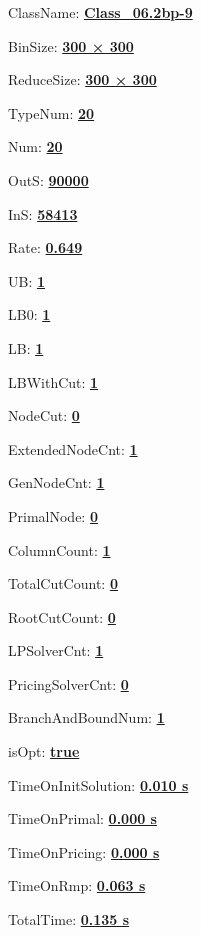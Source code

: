 \documentclass[11pt]{article}
\begin{document}
\pagestyle{empty}


ClassName: \underline{\textbf{Class_06.2bp-9}}
\par
BinSize: \underline{\textbf{300 × 300}}
\par
ReduceSize: \underline{\textbf{300 × 300}}
\par
TypeNum: \underline{\textbf{20}}
\par
Num: \underline{\textbf{20}}
\par
OutS: \underline{\textbf{90000}}
\par
InS: \underline{\textbf{58413}}
\par
Rate: \underline{\textbf{0.649}}
\par
UB: \underline{\textbf{1}}
\par
LB0: \underline{\textbf{1}}
\par
LB: \underline{\textbf{1}}
\par
LBWithCut: \underline{\textbf{1}}
\par
NodeCut: \underline{\textbf{0}}
\par
ExtendedNodeCnt: \underline{\textbf{1}}
\par
GenNodeCnt: \underline{\textbf{1}}
\par
PrimalNode: \underline{\textbf{0}}
\par
ColumnCount: \underline{\textbf{1}}
\par
TotalCutCount: \underline{\textbf{0}}
\par
RootCutCount: \underline{\textbf{0}}
\par
LPSolverCnt: \underline{\textbf{1}}
\par
PricingSolverCnt: \underline{\textbf{0}}
\par
BranchAndBoundNum: \underline{\textbf{1}}
\par
isOpt: \underline{\textbf{true}}
\par
TimeOnInitSolution: \underline{\textbf{0.010 s}}
\par
TimeOnPrimal: \underline{\textbf{0.000 s}}
\par
TimeOnPricing: \underline{\textbf{0.000 s}}
\par
TimeOnRmp: \underline{\textbf{0.063 s}}
\par
TotalTime: \underline{\textbf{0.135 s}}
\par
\newpage
\end{document}
